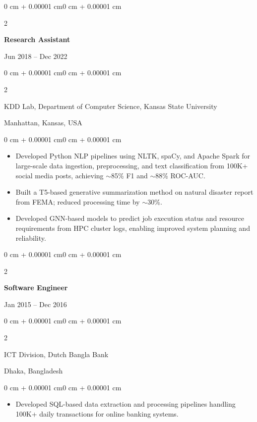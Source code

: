 \documentclass[10pt, letterpaper]{article}
\newenvironment{highlights}{
    \begin{itemize}[topsep=0.10 cm, parsep=0.10 cm, partopsep=0pt, itemsep=0pt, leftmargin=0 cm + 10pt]
}{\end{itemize}}
\newenvironment{onecolentry}{
    \begin{adjustwidth}{0 cm + 0.00001 cm}{0 cm + 0.00001 cm}
}{\end{adjustwidth}}
\newenvironment{twocolentry}[2][]{
    \onecolentry
    \def\secondColumn{#2}
    \setcolumnwidth{\fill, 4.5 cm}
    \begin{paracol}{2}
}{
    \switchcolumn \raggedleft \secondColumn
    \end{paracol}
    \endonecolentry
}
\begin{document}
    \vspace{1mm}

    \begin{twocolentry}{Jun 2018 -- Dec 2022}
        \textbf{Research Assistant}
    \end{twocolentry}
    \begin{twocolentry}{Manhattan, Kansas, USA}
       KDD Lab, Department of Computer Science, Kansas State University
    \end{twocolentry}
    \vspace{0.10 cm}
    \begin{onecolentry}
        \begin{highlights}
            \item Developed Python NLP pipelines using NLTK, spaCy, and Apache Spark for large-scale data ingestion, preprocessing, and text classification from 100K+ social media posts, achieving $\sim$85\% F1 and $\sim$88\% ROC-AUC.
            \item Built a T5-based generative summarization method on natural disaster report from FEMA; reduced processing time by $\sim$30\%.
            \item Developed GNN-based models to predict job execution status and resource requirements from HPC cluster logs, enabling improved system planning and reliability.
        \end{highlights}
    \end{onecolentry}

    \vspace{0.1 cm}
    \begin{twocolentry}{Jan 2015 -- Dec 2016}
        \textbf{Software Engineer}
    \end{twocolentry}
    \begin{twocolentry}{Dhaka, Bangladesh}
       ICT Division, Dutch Bangla Bank
    \end{twocolentry}

    \begin{onecolentry}
        \begin{highlights}
            \item Developed SQL-based data extraction and processing pipelines handling 100K+ daily transactions for online banking systems.
        \end{highlights}
    \end{onecolentry}

\end{document}
